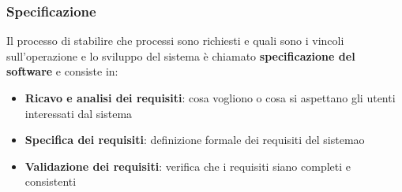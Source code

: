 \documentclass[a4paper]{article}
\begin{document}
\subsubsection{Specificazione}
Il processo di stabilire che processi sono richiesti e quali sono i vincoli sull'operazione
e lo sviluppo del sistema è chiamato \textbf{specificazione del software} e consiste in:
\begin{itemize}
  \item \textbf{Ricavo e analisi dei requisiti}: cosa vogliono o cosa si aspettano
    gli utenti interessati dal sistema

  \item \textbf{Specifica dei requisiti}: definizione formale dei requisiti del sistemao

  \item \textbf{Validazione dei requisiti}: verifica che i requisiti siano completi e
    consistenti
\end{itemize}
\end{document}
